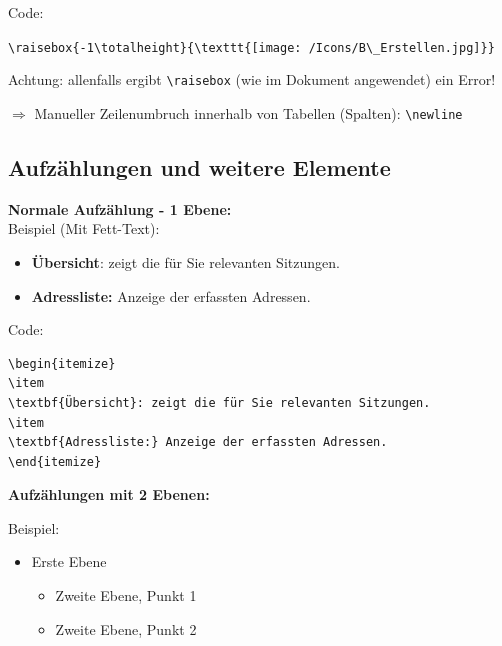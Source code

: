 \vspace{\baselineskip}

Code:

\verb+\raisebox{-1\totalheight}{\texttt{[image: /Icons/B\_Erstellen.jpg]}}+

Achtung: allenfalls ergibt \verb+\raisebox+ (wie im Dokument angewendet) ein Error!

\vspace{\baselineskip}

$\Rightarrow$ Manueller Zeilenumbruch innerhalb von Tabellen (Spalten): \verb+\newline+\\





\subsection{Aufzählungen und weitere Elemente}

\textbf{Normale Aufzählung - 1 Ebene:}\\

Beispiel (Mit Fett-Text):
\begin{itemize}
\item
\textbf{Übersicht}: zeigt die für Sie relevanten Sitzungen.
\item
\textbf{Adressliste:} Anzeige der erfassten Adressen.
\end{itemize}

\vspace{2cm}

Code:
\begin{verbatim}
\begin{itemize}
\item
\textbf{Übersicht}: zeigt die für Sie relevanten Sitzungen.
\item
\textbf{Adressliste:} Anzeige der erfassten Adressen.
\end{itemize}
\end{verbatim}

\textbf{Aufzählungen mit 2 Ebenen:}

Beispiel:
\begin{itemize}
\item Erste Ebene
	\begin{itemize}
		\item Zweite Ebene, Punkt 1
		\item Zweite Ebene, Punkt 2
	\end{itemize}
\end{itemize}


